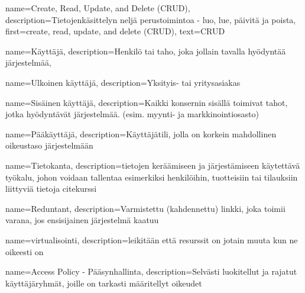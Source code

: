     {
    name={Create, Read, Update, and Delete (CRUD)},
    description={Tietojenkäsittelyn neljä perustoimintoa - luo, lue, päivitä ja poista},
    first={create, read, update, and delete (CRUD)},
    text={CRUD}
    }

    {
    name={Käyttäjä},
    description={Henkilö tai taho, joka jollain tavalla hyödyntää järjestelmää},
    }

    {
    name={Ulkoinen käyttäjä},
    description={Yksityis- tai yritysasiakas}
    }

    {
    name={Sisäinen käyttäjä},
    description={Kaikki konsernin sisällä toimivat tahot, jotka hyödyntävät järjestelmää. (esim. myynti- ja markkinointiosasto)}
    }

    {
    name={Pääkäyttäjä},
    description={Käyttäjätili, jolla on korkein mahdollinen oikeustaso järjestelmään}
    }

    {
    name={Tietokanta},
    description={tietojen keräämiseen ja järjestämiseen käytettävä työkalu, johon voidaan tallentaa esimerkiksi henkilöihin, tuotteisiin tai tilauksiin liittyviä tietoja cite{kurssi}}
    }

    {
    name={Reduntant},
    description={Varmistettu (kahdennettu) linkki, joka toimii varana, jos ensisijainen järjestelmä kaatuu \cite{kurssi}}
    }

    {
    name={virtualisointi},
    description={leikitään että resurssit on jotain muuta kun ne oikeesti on}
    }

    {
    name={Access Policy - Pääsynhallinta},
    description={Selvästi luokitellut ja rajatut käyttäjäryhmät, joille on tarkasti määritellyt oikeudet \cite{sommerville}}
    }

        


